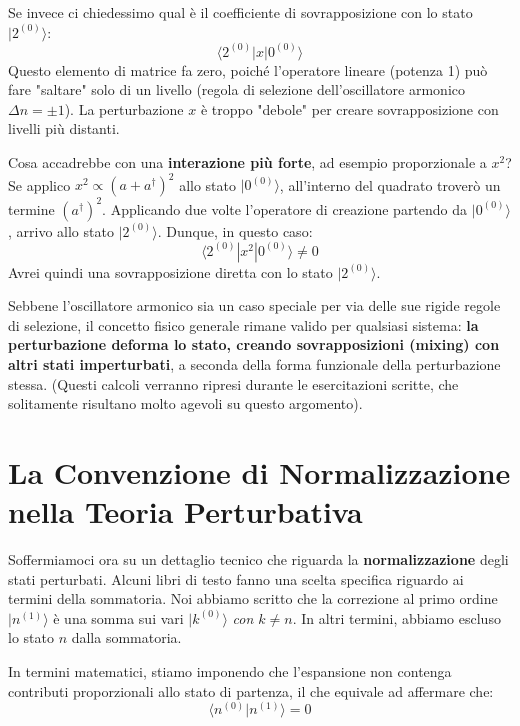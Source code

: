 Se invece ci chiedessimo qual è il coefficiente di sovrapposizione con lo stato $\vert{}2^{(0)}\rangle$:
\begin{equation}
\langle 2^{(0)} | x | 0^{(0)} \rangle
\end{equation}
Questo elemento di matrice fa zero, poiché l'operatore lineare (potenza 1) può fare "saltare" solo di un livello (regola di selezione dell'oscillatore armonico $\Delta n = \pm 1$). La perturbazione $x$ è troppo "debole" per creare sovrapposizione con livelli più distanti.

Cosa accadrebbe con una \textbf{interazione più forte}, ad esempio proporzionale a $x^2$?
Se applico $x^2 \propto (a + a^\dagger)^2$ allo stato $\vert{}0^{(0)}\rangle$, all'interno del quadrato troverò un termine $(a^\dagger)^2$. Applicando due volte l'operatore di creazione partendo da $\vert{}0^{(0)}\rangle$, arrivo allo stato $\vert{}2^{(0)}\rangle$. Dunque, in questo caso:
\begin{equation}
\langle 2^{(0)} | x^2 | 0^{(0)} \rangle \neq 0
\end{equation}
Avrei quindi una sovrapposizione diretta con lo stato $\vert{}2^{(0)}\rangle$.

Sebbene l'oscillatore armonico sia un caso speciale per via delle sue rigide regole di selezione, il concetto fisico generale rimane valido per qualsiasi sistema: \textbf{la perturbazione deforma lo stato, creando sovrapposizioni (mixing) con altri stati imperturbati}, a seconda della forma funzionale della perturbazione stessa. (Questi calcoli verranno ripresi durante le esercitazioni scritte, che solitamente risultano molto agevoli su questo argomento).

\section{La Convenzione di Normalizzazione nella Teoria Perturbativa}

Soffermiamoci ora su un dettaglio tecnico che riguarda la \textbf{normalizzazione} degli stati perturbati.
Alcuni libri di testo fanno una scelta specifica riguardo ai termini della sommatoria. Noi abbiamo scritto che la correzione al primo ordine $\vert{}n^{(1)}\rangle$ è una somma sui vari $\vert{}k^{(0)}\rangle$ \textit{con $k \neq n$}. In altri termini, abbiamo escluso lo stato $n$ dalla sommatoria.

In termini matematici, stiamo imponendo che l'espansione non contenga contributi proporzionali allo stato di partenza, il che equivale ad affermare che:
\begin{equation}
\langle n^{(0)} | n^{(1)} \rangle = 0
\end{equation}

